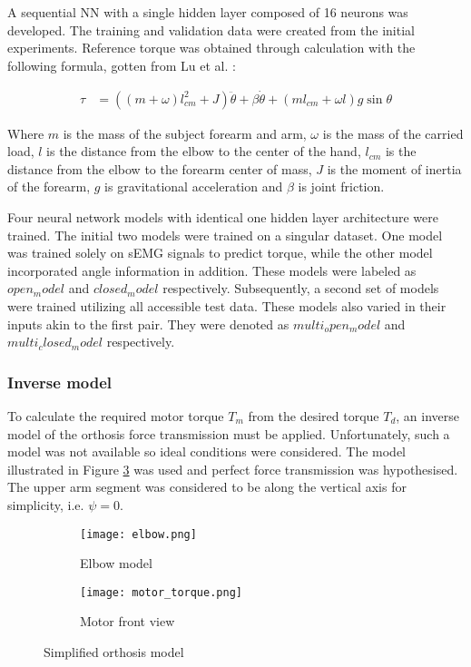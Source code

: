 A sequential NN with a single hidden layer composed of 16 neurons was developed. 
The training and validation data were created from the initial experiments. 
Reference torque was obtained through calculation with the following formula, 
gotten from Lu et al. \cite{lu_development_2019}: 

\begin{align*}
  \tau&=((m+\omega)l_{cm}^2+J)\ddot{\theta}+\beta \dot{\theta}+(ml_{cm}+\omega l)g\sin{\theta}
\end{align*}  

Where $m$ is the mass of the subject forearm and arm, $\omega$ is the mass of 
the carried load, $l$ is the distance from the elbow to the center of the hand,
$l_{cm}$ is the distance from the elbow to the forearm center of mass, $J$ is 
the moment of inertia of the forearm, $g$ is gravitational acceleration and 
$\beta$ is joint friction.  

Four neural network models with identical one hidden layer architecture were trained. 
The initial two models were trained on a singular dataset. One model was trained 
solely on sEMG signals to predict torque, while the other model incorporated angle 
information in addition. These models were labeled as $open_model$ and $closed_model$ 
respectively. Subsequently, a second set of models were trained utilizing all 
accessible test data. These models also varied in their inputs akin to the first 
pair. They were denoted as $multi_open_model$ and $multi_closed_model$ respectively.
\FloatBarrier

\subsubsection{Inverse model}
To calculate the required motor torque $T_m$ from the desired torque $T_d$, 
an inverse model of the orthosis force transmission must be applied. Unfortunately, 
such a model was not available so ideal conditions were considered. The model 
illustrated in Figure \ref{fig:orthosis_model} was used and perfect force 
transmission was hypothesised. The upper arm segment was considered to be along the 
vertical axis for simplicity, i.e. $\psi=0$.  

\begin{figure}[htbp]
    \centering
    \begin{subfigure}{0.2\textwidth}
        \centering
        \texttt{[image: elbow.png]}
        \caption{Elbow model}
        \label{fig:elbow}
    \end{subfigure}
    \begin{subfigure}{0.3\textwidth}
        \centering
        \texttt{[image: motor\_torque.png]}
        \caption{Motor front view}
        \label{fig:motor}
    \end{subfigure}
    \caption{
      Simplified orthosis model
    }
    \label{fig:orthosis_model}
\end{figure}

